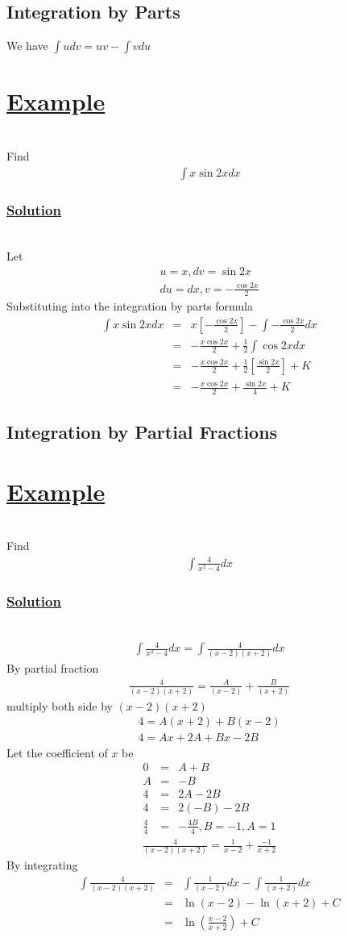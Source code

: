 \documentclass[12pt]{report}
\newcommand{\ubt}[1]{\textbf{\underline{#1}}}
\newcommand{\sps}{\\[0.2cm]}
\newcommand{\spn}[1]{\\[#1cm]}
\newcommand{\dsp}{\displaystyle}
\newcommand{\solution}{\subsubsection{\ubt{Solution}}{~}\spn{-2}}
\newcommand{\eg}{\section*{\ubt{Example}}{~}\spn{-1}}
\begin{document}
	\subsection{Integration by Parts}
	We have $\dsp \int udv = uv - \int v du$
	\eg
	Find
	\begin{eqnarray*}
		\int x \sin 2x dx
	\end{eqnarray*}
	\solution
	Let
	\begin{gather*}
		u=x, dv = \sin 2x\sps
		du =dx, v = -\frac{\cos 2x}{2}
	\end{gather*}
	Substituting into the integration by parts formula
	\begin{eqnarray*}
		\int x\sin 2x dx &=& x\left[-\frac{\cos 2x}{2}\right] - \int -\frac{\cos 2x}{2}dx\sps
		&=& - \frac{x\cos 2x}{2} + \frac{1}{2}\int\cos 2x dx\sps
		&=& -\frac{x\cos2x}{2} + \frac{1}{2}\left[\frac{\sin2x}{2}\right] + K\sps
		&=& -\frac{x\cos 2x}{2} + \frac{\sin2x}{4} + K
	\end{eqnarray*}
	
	\subsection{Integration by Partial Fractions}
	\eg
	Find
	\begin{eqnarray*}
		\int \frac{4}{x^2-4}dx
	\end{eqnarray*}
	\solution
	\begin{eqnarray*}
		\int \frac{4}{x^2-4}dx = \int\frac{4}{(x-2)(x+2)}dx
	\end{eqnarray*}
	By partial fraction
	\begin{eqnarray*}
		\frac{4}{(x-2)(x+2)} = \frac{A}{(x-2)} + \frac{B}{(x+2)}
	\end{eqnarray*}
	multiply both side by $(x-2)(x+2)$
	\begin{gather*}
		4 = A(x+2) + B(x-2)\sps
		4 = Ax + 2A + Bx - 2B
	\end{gather*}
	Let the coefficient of $x$ be
	\begin{eqnarray*}
		0 &=& A + B\sps
		A &=& - B\sps
		4 &=& 2A - 2B\sps
		4 &=&2(-B) - 2B\sps
		\frac{4}{4} &=& -\frac{4B}{4}, B=-1, A=1
	\end{eqnarray*}
	\begin{eqnarray*}
		\frac{4}{(x-2)(x+2)} = \frac{1}{x-2}+ \frac{-1}{x+2}
	\end{eqnarray*}
	By integrating
	\begin{eqnarray*}
		\int \frac{4}{(x-2)(x+2)} &=& \int \frac{1}{(x-2)}dx - \int\frac{1}{(x+2)}dx\sps
		&=& \ln(x-2) - \ln(x+2) + C\sps
		&=& \ln\left(\frac{x-2}{x+2}\right) + C
	\end{eqnarray*}
	
\end{document}
